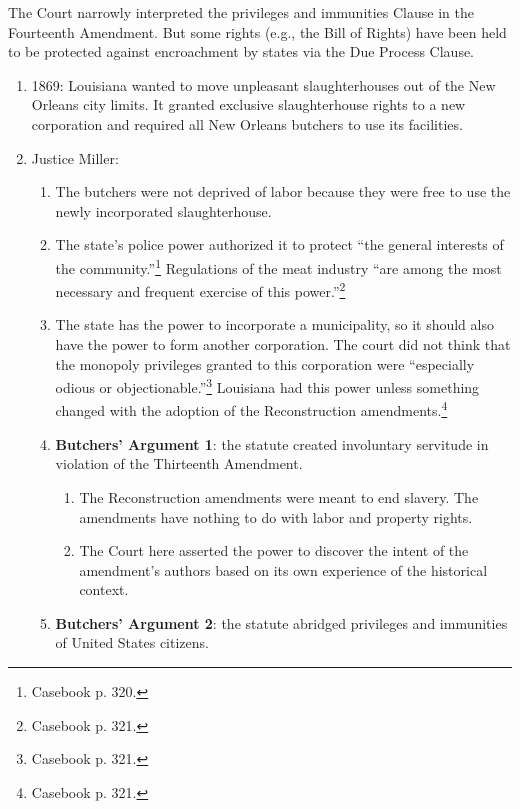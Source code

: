 The Court narrowly interpreted the privileges and immunities Clause in the 
Fourteenth Amendment. But some rights (e.g., the Bill of Rights) have been 
held to be protected against encroachment by states via the Due Process 
Clause.

\begin{enumerate}
    \item 1869: Louisiana wanted to move unpleasant slaughterhouses out of the 
    New Orleans city limits. It granted exclusive slaughterhouse rights to a 
    new corporation and required all New Orleans butchers to use its 
    facilities.  \item Justice Miller:
    \begin{enumerate}
        \item The butchers were not deprived of labor because they were free 
        to use the newly incorporated slaughterhouse.
        \item The state's police power authorized it to protect ``the general 
        interests of the community.''\footnote{Casebook p. 320.} Regulations of 
        the meat industry ``are among the most necessary and frequent exercise 
        of this power.''\footnote{Casebook p. 321.}
        \item The state has the power to incorporate a municipality, so it 
        should also have the power to form another corporation. The court did 
        not think that the monopoly privileges granted to this corporation 
        were ``especially odious or objectionable.''\footnote{Casebook p. 
        321.} Louisiana had this power unless something changed with the 
        adoption of the Reconstruction amendments.\footnote{Casebook p. 321.}
        \item \textbf{Butchers' Argument 1}: the statute created involuntary 
        servitude in violation of the Thirteenth Amendment.
        \begin{enumerate}
            \item The Reconstruction amendments were meant to end slavery. 
            The amendments have nothing to do with labor and property rights.
            \item The Court here asserted the power to discover the intent of 
            the amendment's authors based on its own experience of the 
            historical context.
        \end{enumerate}
        \item \textbf{Butchers' Argument 2}: the statute abridged privileges and 
        immunities of United States citizens.

\end{enumerate}
\end{enumerate}
